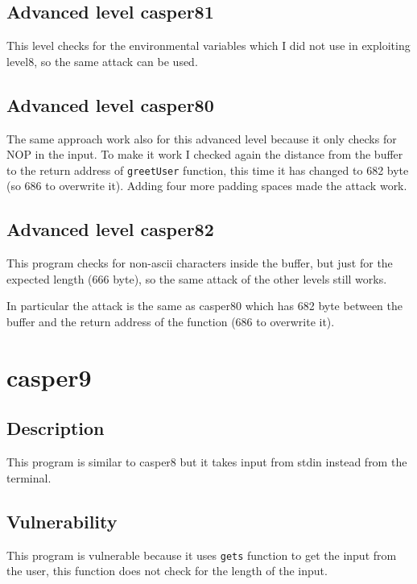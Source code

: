 \documentclass[a4paper,12pt]{article}
\begin{document}
\subsection{Advanced level casper81}

This level checks for the environmental variables which I did not use in exploiting level8, so the same attack can be used.

\subsection{Advanced level casper80}

The same approach work also for this advanced level because it only checks for NOP in the input. To make it work I checked again the distance from the buffer to the return address of \texttt{greetUser} function, this time it has changed to 682 byte (so 686 to overwrite it). Adding four more padding spaces made the attack work.



\subsection{Advanced level casper82}

This program checks for non-ascii characters inside the buffer, but just for the expected length (666 byte), so the same attack of the other levels still works.

In particular the attack is the same as casper80 which has 682 byte between the buffer and the return address of the function (686 to overwrite it).

\section{casper9}
\subsection{Description}
This program is similar to casper8 but it takes input from stdin instead from the terminal.

\subsection{Vulnerability}
This program is vulnerable because it uses \texttt{gets} function to get the input from the user, this function does not check for the length of the input.
\end{document}
